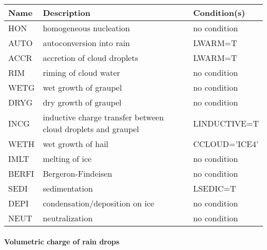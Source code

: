 \begin{longtable} {|p{}|p{}|p{}|}
\hline
Name & Description & Condition(s) \\
\hline \hline
\endhead
HON    & homogeneous nucleation         & no condition \\\hline
AUTO   & autoconversion into rain       & LWARM=T \\\hline
ACCR   & accretion of cloud droplets    & LWARM=T \\\hline
RIM    & riming of cloud water          & no condition \\\hline
WETG   & wet growth of graupel          & no condition \\\hline
DRYG   & dry growth of graupel          & no condition \\\hline
INCG   & inductive charge transfer between cloud droplets and graupel & LINDUCTIVE=T \\\hline
WETH   & wet growth of hail             & CCLOUD='ICE4' \\\hline
IMLT   & melting of ice                 & no condition \\\hline
BERFI  & Bergeron-Findeisen             & no condition \\\hline
SEDI   & sedimentation                  & LSEDIC=T \\\hline
DEPI   & condensation/deposition on ice & no condition \\\hline
NEUT   & neutralization                 & no condition \\\hline
\end{longtable}

\paragraph{Volumetric charge of rain drops}
\mbox{} %

